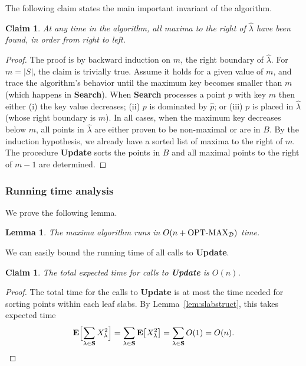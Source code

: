 \documentclass[letterpaper,11pt]{article}
\newtheorem{lemma}[theorem]{Lemma}
\newtheorem{claim}[theorem]{Claim}
\newcommand{\wlambda}{\widehat{\lambda}}
\newcommand{\EX}{\hbox{\bf E}}
\newcommand{\OPTMAX}{\text{OPT-MAX}}
\newcommand{\bS}{\textbf{S}}
\newcommand{\cD}{\mathcal{D}}
\begin{document}
The following claim states the main 
important invariant of the algorithm.

\begin{claim}\label{clm:order} 
  At any time in the algorithm, all 
  maxima to the right of $\wlambda$ have 
  been found, in order from right to left.
\end{claim}

\begin{proof} 
The proof is by backward induction on 
$m$, the right boundary of $\wlambda$.
For $m = |S|$, the claim is trivially true. 
Assume it holds for a given value of $m$, 
and trace the algorithm's behavior until 
the maximum key becomes smaller than $m$ 
(which happens in \textbf{Search}). 
When \textbf{Search}
processes a point $p$ with key $m$ 
then either (i) the key value decreases; 
(ii) $p$ is dominated by $\hat{p}$; 
or (iii) $p$ is  placed in 
$\wlambda$ (whose right boundary is $m$). 
In all cases, when the maximum key decreases
below $m$, all points in $\wlambda$ are 
either proven to be non-maximal
or are in $B$. By the induction hypothesis, 
we already have a sorted
list of maxima to the right of $m$.
The procedure \textbf{Update} sorts the 
points in $B$ and all maximal points 
to the right of $m-1$ are determined.
\end{proof}


\subsubsection{Running time analysis}\label{sec:runtime}

We prove the following lemma.

\begin{lemma}\label{lem:algoMaxima} 
  The maxima algorithm runs in 
  $O(n+\textup{\OPTMAX}_\cD)$ time.
\end{lemma}

We can easily bound the running time 
of all calls to \textbf{Update}.

\begin{claim}\label{clm:update} 
  The total expected time for
  calls to \textbf{Update} 
  is $O(n)$.
\end{claim}

\begin{proof}
The total time for the calls to 
\textbf{Update} is at most
the time needed for sorting 
points within each leaf slabs. 
By Lemma~\ref{lem:slabstruct}, 
this takes expected time
\[
  \EX \Bigl[\sum_{\lambda \in \bS} X_\lambda^2\Bigr]
  =  \sum_{\lambda \in \bS} \EX\bigl[X_\lambda^2\bigr]
  =  \sum_{\lambda \in \bS} O(1)
  =  O(n).
\] 
\end{proof}
\end{document}
